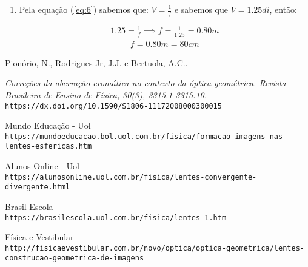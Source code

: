\documentclass[12pt]{extarticle}
\newcommand{\<}{\langle}
\renewcommand{\>}{\rangle}
\theoremstyle{definition}
\begin{document}
\begin{enumerate}
\begin{enumerate}
        \item
        Pela equação (\ref{eq:6}) sabemos que: $V= \frac{1}{f}$ e sabemos que $V=1.25 di$, então:
        
        \begin{align*}
            1.25 = \frac{1}{f} \implies f = \frac{1}{1.25} = 0.80 m
        \end{align*}
        \begin{align*}
            f = 0.80 m = 80 cm
        \end{align*}
    \end{enumerate}

\end{enumerate}

\begin{thebibliography}{9}




Pionório, N., Rodrigues Jr, J.J. e Bertuola, A.C..

\textit{ Correções da aberração cromática no contexto da óptica geométrica. Revista Brasileira de Ensino de Física, 30(3), 3315.1-3315.10.} 
\texttt{https://dx.doi.org/10.1590/S1806-11172008000300015}

Mundo Educação - Uol
\\\texttt{https://mundoeducacao.bol.uol.com.br/fisica/formacao-imagens-nas-lentes-esfericas.htm}

Alunos Online - Uol
\\\texttt{https://alunosonline.uol.com.br/fisica/lentes-convergente-divergente.html}

Brasil Escola
\\\texttt{https://brasilescola.uol.com.br/fisica/lentes-1.htm}

Física e Vestibular
\\\texttt{http://fisicaevestibular.com.br/novo/optica/optica-geometrica/lentes-construcao-geometrica-de-imagens}

\end{thebibliography}
\end{document}
